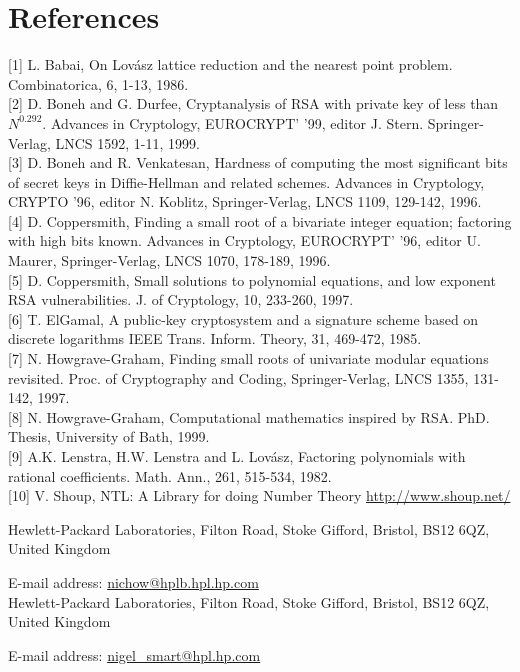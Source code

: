 \documentclass[10pt]{article}
\begin{document}
\section*{References}
[1] L. Babai, On Lovász lattice reduction and the nearest point problem. Combinatorica, 6, 1-13, 1986.\\[0pt]
[2] D. Boneh and G. Durfee, Cryptanalysis of RSA with private key of less than $N^{0.292}$. Advances in Cryptology, EUROCRYPT' '99, editor J. Stern. Springer-Verlag, LNCS 1592, 1-11, 1999.\\[0pt]
[3] D. Boneh and R. Venkatesan, Hardness of computing the most significant bits of secret keys in Diffie-Hellman and related schemes. Advances in Cryptology, CRYPTO '96, editor N. Koblitz, Springer-Verlag, LNCS 1109, 129-142, 1996.\\[0pt]
[4] D. Coppersmith, Finding a small root of a bivariate integer equation; factoring with high bits known. Advances in Cryptology, EUROCRYPT' '96, editor U. Maurer, Springer-Verlag, LNCS 1070, 178-189, 1996.\\[0pt]
[5] D. Coppersmith, Small solutions to polynomial equations, and low exponent RSA vulnerabilities. J. of Cryptology, 10, 233-260, 1997.\\[0pt]
[6] T. ElGamal, A public-key cryptosystem and a signature scheme based on discrete logarithms IEEE Trans. Inform. Theory, 31, 469-472, 1985.\\[0pt]
[7] N. Howgrave-Graham, Finding small roots of univariate modular equations revisited. Proc. of Cryptography and Coding, Springer-Verlag, LNCS 1355, 131-142, 1997.\\[0pt]
[8] N. Howgrave-Graham, Computational mathematics inspired by RSA. PhD. Thesis, University of Bath, 1999.\\[0pt]
[9] A.K. Lenstra, H.W. Lenstra and L. Lovász, Factoring polynomials with rational coefficients. Math. Ann., 261, 515-534, 1982.\\[0pt]
[10] V. Shoup, NTL: A Library for doing Number Theory \href{http://www.shoup.net/}{http://www.shoup.net/}

Hewlett-Packard Laboratories, Filton Road, Stoke Gifford, Bristol, BS12 6QZ, United Kingdom

E-mail address: \href{mailto:nichow@hplb.hpl.hp.com}{nichow@hplb.hpl.hp.com}\\
Hewlett-Packard Laboratories, Filton Road, Stoke Gifford, Bristol, BS12 6QZ, United Kingdom

E-mail address: \href{mailto:nigel_smart@hpl.hp.com}{nigel\_smart@hpl.hp.com}
\end{document}
